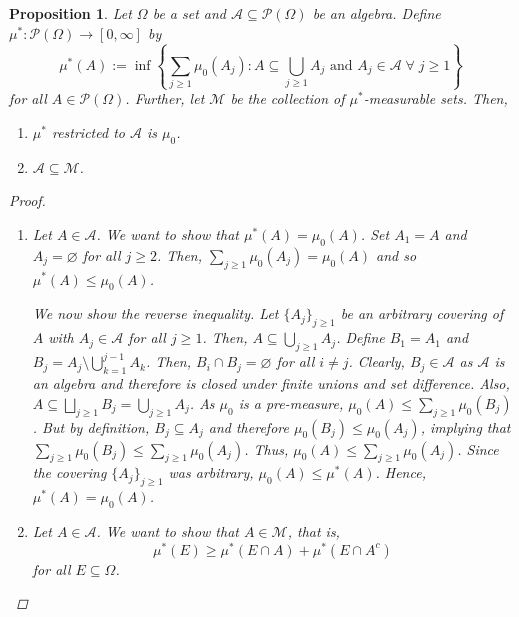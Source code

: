\documentclass{article}
\newcommand{\A}{\mathscr{A}}
\newcommand{\Po}{\mathscr{P}}
\newcommand{\M}{\mathcal{M}}
\theoremstyle{spaced}
\newtheorem{proposition}[theorem]{Proposition}
\begin{document}
\begin{proposition}
    Let $\Omega$ be a set and $\A \subseteq \Po(\Omega)$ be an algebra. Define $\mu^*: \Po(\Omega) \to [0, \infty]$ by
    \begin{equation*}
        \mu^*(A) := \inf\left\{ \sum_{j\geq 1} \mu_0(A_j) : A \subseteq \bigcup_{j \geq 1} A_j \text{ and } A_j \in \A \; \forall \; j \geq 1 \right\}
    \end{equation*}
    for all $A \in \Po(\Omega)$. Further, let $\M$ be the collection of $\mu^*$-measurable sets. Then, 
    \begin{enumerate}
        \item $\mu^*$ restricted to $\A$ is $\mu_0$.
        \item $\A \subseteq \M$.
    \end{enumerate}

    \begin{proof}
        \begin{enumerate}
            \item Let $A \in \A$. We want to show that $\mu^*(A) = \mu_0(A)$. Set $A_1 = A$ and $A_j = \varnothing$ for all $j \geq 2$. Then, $\sum_{j \geq 1} \mu_0(A_j) = \mu_0(A)$ and so $\mu^*(A) \leq \mu_0(A)$.

            We now show the reverse inequality. Let $\{A_j\}_{j \geq 1}$ be an arbitrary covering of $A$ with $A_j \in \A$ for all $j \geq 1$. Then, $A \subseteq \bigcup_{j \geq 1} A_j$. Define $B_1 = A_1$ and $B_j = A_j \setminus \bigcup_{k=1}^{j-1}A_k$. Then, $B_i \cap B_j = \varnothing$ for all $i \neq j$. Clearly, $B_j \in \A$ as $\A$ is an algebra and therefore is closed under finite unions and set difference. Also, $A \subseteq \bigsqcup_{j \geq 1} B_j = \bigcup_{j \geq 1} A_j$. As $\mu_0$ is a pre-measure, $\mu_0(A) \leq \sum_{j \geq 1} \mu_0(B_j)$. But by definition, $B_j \subseteq A_j$ and therefore $\mu_0(B_j) \leq \mu_0(A_j)$, implying that $\sum_{j \geq 1} \mu_0(B_j) \leq \sum_{j \geq 1} \mu_0(A_j)$. Thus, $\mu_0(A) \leq \sum_{j \geq 1} \mu_0(A_j)$. Since the covering $\{A_j\}_{j \geq 1}$ was arbitrary, $\mu_0(A) \leq \mu^*(A)$. Hence, $\mu^*(A) = \mu_0(A)$.

            \item Let $A \in \A$. We want to show that $A \in \M$, that is, 
            \begin{equation*}
                \mu^*(E) \geq \mu^*(E \cap A) + \mu^*(E \cap A^c)
            \end{equation*}
            for all $E \subseteq \Omega$. 


\end{enumerate}
\end{proof}
\end{proposition}
\end{document}
